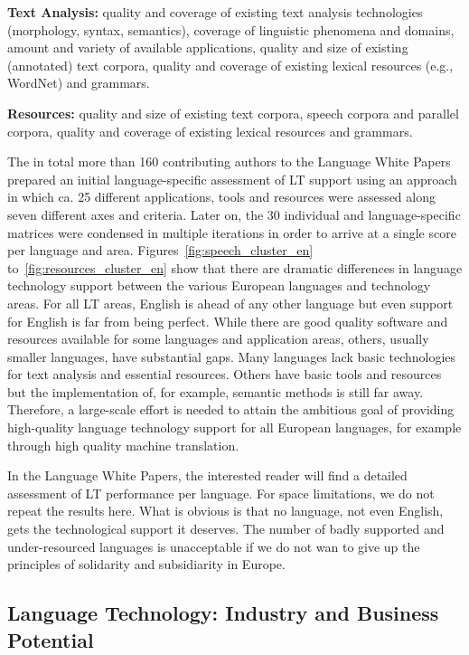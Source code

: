 \documentclass[10pt, plain]{../../metanetpaper}
\begin{document}
\begin{multicols}{2}
\textbf{Text Analysis:} quality and coverage of existing text analysis technologies (morphology, syntax, semantics), coverage of linguistic phenomena and domains, amount and variety of available applications, quality and size of existing (annotated) text corpora, quality and coverage of existing lexical resources (e.g., WordNet) and grammars.

\textbf{Resources:} quality and size of existing text corpora, speech corpora and parallel corpora, quality and coverage of existing lexical resources and grammars.

The in total more than 160 contributing authors to the Language White Papers prepared an initial language-specific assessment of LT support using an approach in which ca. 25 different applications, tools and resources were assessed along seven different axes and criteria. Later on, the 30 individual and language-specific matrices were condensed in multiple iterations in order to arrive at a single score per language and area. Figures~\ref{fig:speech_cluster_en} to~\ref{fig:resources_cluster_en} show that there are dramatic differences in language technology support between the various European languages and technology areas. For all LT areas, English is ahead of any other language but even support for English is far from being perfect. While there are good quality software and resources available for some languages and application areas, others, usually smaller languages, have substantial gaps. Many languages lack basic technologies for text analysis and essential resources. Others have basic tools and resources but the implementation of, for example, semantic methods is still far away. Therefore, a large-scale effort is needed to attain the ambitious goal of providing high-quality language technology support for all European languages, for example through high quality machine translation.

In the 	Language White Papers, the interested reader will find a detailed assessment of LT performance per language. For space limitations, we do not repeat the results here. What is obvious is that no language, not even English, gets the technological support it deserves. The number of badly supported and under-resourced languages is unacceptable if we do not wan to give up the principles of solidarity and subsidiarity in Europe.

\subsection{Language Technology: Industry and Business Potential}
\label{sec:lang-techn-industry}


\end{multicols}
\end{document}
